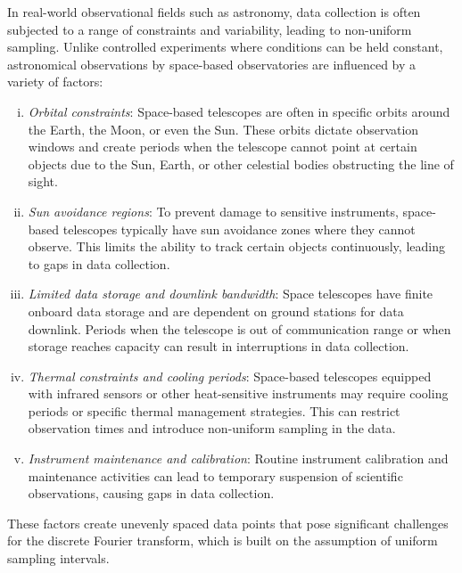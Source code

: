     			In real-world observational fields such as astronomy, data collection is often subjected to a range of constraints and variability, leading to non-uniform sampling. Unlike controlled experiments where conditions can be held constant, astronomical observations by space-based observatories are influenced by a variety of factors:
    			\begin{enumerate}[i.]
    				\item \textit{Orbital constraints}: Space-based telescopes are often in specific orbits around the Earth, the Moon, or even the Sun. These orbits dictate observation windows and create periods when the telescope cannot point at certain objects due to the Sun, Earth, or other celestial bodies obstructing the line of sight.
    				\item \textit{Sun avoidance regions}: To prevent damage to sensitive instruments, space-based telescopes typically have sun avoidance zones where they cannot observe. This limits the ability to track certain objects continuously, leading to gaps in data collection.
    				\item \textit{Limited data storage and downlink bandwidth}: Space telescopes have finite onboard data storage and are dependent on ground stations for data downlink. Periods when the telescope is out of communication range or when storage reaches capacity can result in interruptions in data collection.
    				\item \textit{Thermal constraints and cooling periods}: Space-based telescopes equipped with infrared sensors or other heat-sensitive instruments may require cooling periods or specific thermal management strategies. This can restrict observation times and introduce non-uniform sampling in the data.
    				\item \textit{Instrument maintenance and calibration}: Routine instrument calibration and maintenance activities can lead to temporary suspension of scientific observations, causing gaps in data collection.
    			\end{enumerate}
    			These factors create unevenly spaced data points that pose significant challenges for the discrete Fourier transform, which is built on the assumption of uniform sampling intervals.
    			

